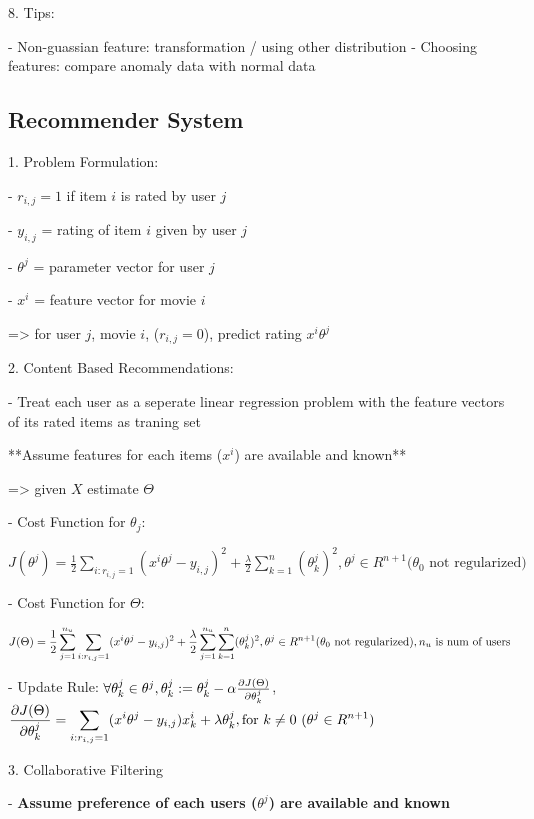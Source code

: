8. Tips:

- Non-guassian feature: transformation / using other distribution
- Choosing features: compare anomaly data with normal data


\subsection{Recommender System}

1. Problem Formulation:

- $r_{i,j}=1$ if item $i$ is rated by user $j$ 

- $y_{i,j}$ = rating of item $i$ given by user $j$ 

- $\theta^j$ = parameter vector for user $j$ 

- $x^i$ = feature vector for movie $i$ 

=> for user $j$, movie $i$, ($r_{i,j}=0$), predict rating $x^i\theta^j$

2. Content Based Recommendations:

- Treat each user as a seperate linear regression problem with the feature vectors of its rated items as traning set

**Assume features for each items ($x^i$) are available and known**

=> given $X$ estimate $\Theta$ 

- Cost Function for $\theta_j$: 

$\displaystyle J(\theta^j)= \frac1 {2} \sum_{i:r_{i,j}=1}(x^i\theta^j-y_{i,j})^2+\frac \lambda {2} \sum_{k=1}^n(\theta^j_k)^2, \theta^j \in R^{n+1} (\theta_0 \text{ not regularized)}$

- Cost Function for $\Theta$:

$\displaystyle J(\Theta)= \frac1{2} \sum_{j=1}^{n_u} \sum_{i:r_{i,j}=1}(x^i\theta^j-y_{i,j})^2+\frac \lambda {2} \sum_{j=1}^{n_u} \sum_{k=1}^n(\theta^j_k)^2, \\ \theta^j \in R^{n+1} (\theta_0 \text{ not regularized)}, \space n_u \text{ is num of users}$ 

- Update Rule: \(\forall \theta^j_k \in \theta^j, \theta^j_k := \theta^j_k-\alpha\large\frac{\partial J(\Theta)}{\partial\theta^j_k}\), \(\displaystyle \frac{\partial J(\Theta)}{\partial\theta^j_k}=\sum_{i:r_{i,j}=1}(x^i\theta^j-y_{i,j})x_k^i+ \lambda \theta_k^j, \space \text{for $k \neq 0$ ($\theta^j \in R^{n+1}$)}\) 

3. Collaborative Filtering

- \textbf{Assume preference of each users ($\theta^j$) are available and known}

